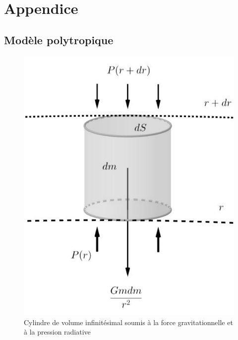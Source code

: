 


\chapter{Appendice}\label{7}
\section{Modèle polytropique}\label{7.1}

\begin{figure}[H]
	\centering
	\includegraphics[scale=0.5]{images/cylindre}
	\caption[Cylindre de volume infinitésimal soumis à la force gravitationnelle et à la pression radiative - figure réalisée avec GeoGebra]{Cylindre de volume infinitésimal soumis à la force gravitationnelle et à la pression radiative}
	\label{Fig. 7.1}
\end{figure}\bigskip

